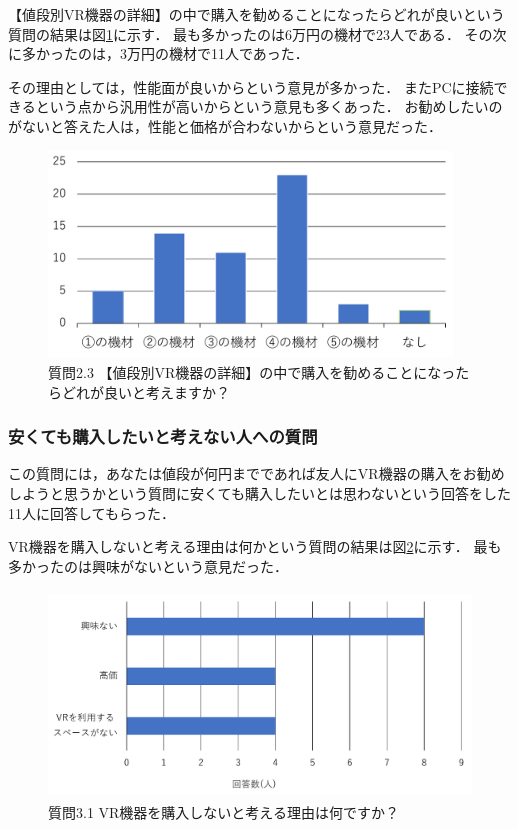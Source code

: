 \documentclass[12pt,a4j]{ltjsarticle}
\begin{document}
【値段別VR機器の詳細】の中で購入を勧めることになったらどれが良いという質問の結果は図\ref{fig:アンケート2_2_3.pdf}に示す．
最も多かったのは6万円の機材で23人である．
その次に多かったのは，3万円の機材で11人であった．

その理由としては，性能面が良いからという意見が多かった．
またPCに接続できるという点から汎用性が高いからという意見も多くあった．
お勧めしたいのがないと答えた人は，性能と価格が合わないからという意見だった．

\begin{figure}[h]
\begin{center}
 \includegraphics[clip,height=55mm]{
 アンケート2_2_3.pdf}
\end{center}
 \caption{質問2.3 【値段別VR機器の詳細】の中で購入を勧めることになったらどれが良いと考えますか？}
 \label{fig:アンケート2_2_3.pdf}
\end{figure}

\subsubsection{安くても購入したいと考えない人への質問}
この質問には，あなたは値段が何円までであれば友人にVR機器の購入をお勧めしようと思うかという質問に安くても購入したいとは思わないという回答をした11人に回答してもらった．

VR機器を購入しないと考える理由は何かという質問の結果は図\ref{fig:アンケート2_3_1.pdf}に示す．
最も多かったのは興味がないという意見だった．

\begin{figure}[h]
\begin{center}
 \includegraphics[clip,height=55mm]{
 アンケート2_3_1.pdf}
\end{center}
 \caption{質問3.1 VR機器を購入しないと考える理由は何ですか？}
 \label{fig:アンケート2_3_1.pdf}
\end{figure}
\end{document}
